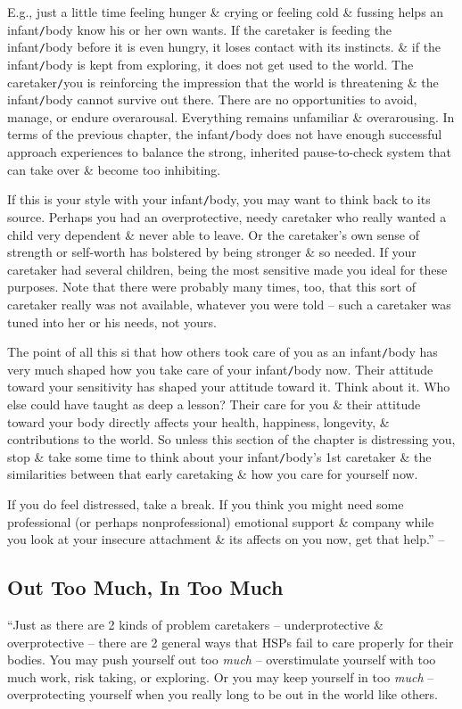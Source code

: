 \documentclass{article}
\numberwithin{equation}{section}
\begin{document}
E.g., just a little time feeling hunger \& crying or feeling cold \& fussing helps an infant{\tt/}body know his or her own wants. If the caretaker is feeding the infant{\tt/}body before it is even hungry, it loses contact with its instincts. \& if the infant{\tt/}body is kept from exploring, it does not get used to the world. The caretaker{\tt/}you is reinforcing the impression that the world is threatening \& the infant{\tt/}body cannot survive out there. There are no opportunities to avoid, manage, or endure overarousal. Everything remains unfamiliar \& overarousing. In terms of the previous chapter, the infant{\tt/}body does not have enough successful approach experiences to balance the strong, inherited pause-to-check system that can take over \& become too inhibiting.

If this is your style with your infant{\tt/}body, you may want to think back to its source. Perhaps you had an overprotective, needy caretaker who really wanted a child very dependent \& never able to leave. Or the caretaker's own sense of strength or self-worth has bolstered by being stronger \& so needed. If your caretaker had several children, being the most sensitive made you ideal for these purposes. Note that there were probably many times, too, that this sort of caretaker really was not available, whatever you were told -- such a caretaker was tuned into her or his needs, not yours.

The point of all this si that how others took care of you as an infant{\tt/}body has very much shaped how you take care of your infant{\tt/}body now. Their attitude toward your sensitivity has shaped your attitude toward it. Think about it. Who else could have taught as deep a lesson? Their care for you \& their attitude toward your body directly affects your health, happiness, longevity, \& contributions to the world. So unless this section of the chapter is distressing you, stop \& take some time to think about your infant{\tt/}body's 1st caretaker \& the similarities between that early caretaking \& how you care for yourself now.

If you do feel distressed, take a break. If you think you might need some professional (or perhaps nonprofessional) emotional support \& company while you look at your insecure attachment \& its affects on you now, get that help.'' -- \cite[pp. 78--81]{Aron2013}

\subsection{Out Too Much, In Too Much}
``Just as there are 2 kinds of problem caretakers -- underprotective \& overprotective -- there are 2 general ways that HSPs fail to care properly for their bodies. You may push yourself out too \textit{much} -- overstimulate yourself with too much work, risk taking, or exploring. Or you may keep yourself in too \textit{much} -- overprotecting yourself when you really long to be out in the world like others.
\end{document}
